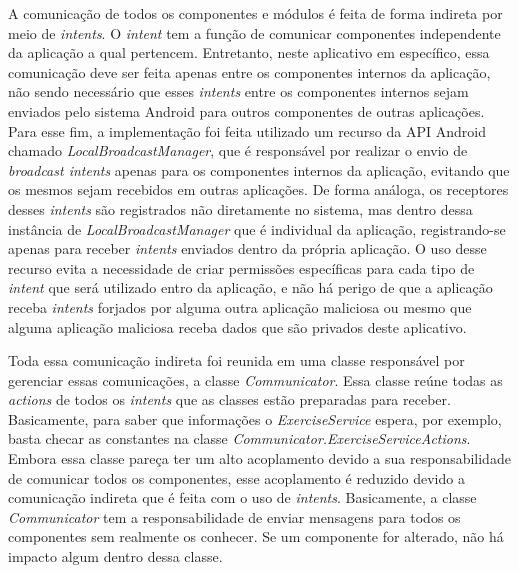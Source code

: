 A comunicação de todos os componentes e módulos é feita de forma indireta por meio de \textit{intents}. O \textit{intent} tem a função de comunicar componentes independente da aplicação a qual pertencem. Entretanto, neste aplicativo em específico, essa comunicação deve ser feita apenas entre os componentes internos da aplicação, não sendo necessário que esses \textit{intents} entre os componentes internos sejam enviados pelo sistema Android para outros componentes de outras aplicações. Para esse fim, a implementação foi feita utilizado um recurso da API Android chamado \textit{LocalBroadcastManager}, que é responsável por realizar o envio de \textit{broadcast intents} apenas para os componentes internos da aplicação, evitando que os mesmos sejam recebidos em outras aplicações. De forma análoga, os receptores desses \textit{intents} são registrados não diretamente no sistema, mas dentro dessa instância de \textit{LocalBroadcastManager} que é individual da aplicação, registrando-se apenas para receber \textit{intents} enviados dentro da própria aplicação. O uso desse recurso evita a necessidade de criar permissões específicas para cada tipo de \textit{intent} que será utilizado entro da aplicação, e não há perigo de que a aplicação receba \textit{intents} forjados por alguma outra aplicação maliciosa ou mesmo que alguma aplicação maliciosa receba dados que são privados deste aplicativo.

Toda essa comunicação indireta foi reunida em uma classe responsável por gerenciar essas comunicações, a classe \textit{Communicator}. Essa classe reúne todas as \textit{actions} de todos os \textit{intents} que as classes estão preparadas para receber. Basicamente, para saber que informações o \textit{ExerciseService} espera, por exemplo, basta checar as constantes na classe \textit{Communicator.ExerciseServiceActions}. Embora essa classe pareça ter um alto acoplamento devido a sua responsabilidade de comunicar todos os componentes, esse acoplamento é reduzido devido a comunicação indireta que é feita com o uso de \textit{intents}. Basicamente, a classe \textit{Communicator} tem a responsabilidade de enviar mensagens para todos os componentes sem realmente os conhecer. Se um componente for alterado, não há impacto algum dentro dessa classe.

